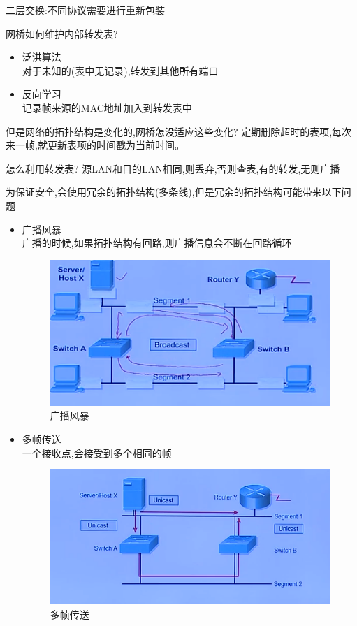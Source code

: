 \documentclass[UTF8,a4paper]{ctexart}
\begin{document}
二层交换:不同协议需要进行重新包装

网桥如何维护内部转发表?
\begin{itemize}
  \item 泛洪算法\\
  对于未知的(表中无记录),转发到其他所有端口
  \item 反向学习\\
  记录帧来源的MAC地址加入到转发表中
\end{itemize}

但是网络的拓扑结构是变化的,网桥怎没适应这些变化?
定期删除超时的表项,每次来一帧,就更新表项的时间戳为当前时间。

怎么利用转发表?
源LAN和目的LAN相同,则丢弃,否则查表,有的转发,无则广播


为保证安全,会使用冗余的拓扑结构(多条线),但是冗余的拓扑结构可能带来以下问题
\begin{itemize}
  \item 广播风暴\\
  广播的时候,如果拓扑结构有回路,则广播信息会不断在回路循环
  \begin{figure}[H]
    \centering
    \includegraphics{assets/jisuanjiwangluo_4887c.png}
    \caption{广播风暴}
  \end{figure}
  \item 多帧传送\\
  一个接收点,会接受到多个相同的帧
  \begin{figure}[H]
    \centering
    \includegraphics{assets/jisuanjiwangluo_ac9fa.png}
    \caption{多帧传送}
  \end{figure}


\end{itemize}
\end{document}
